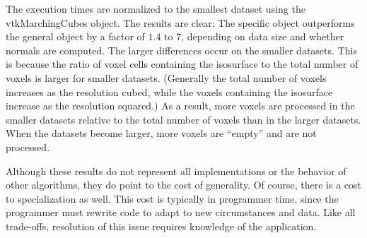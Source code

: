 The execution times are normalized to the smallest dataset using the vtkMarchingCubes object. The results are clear: The specific object outperforms the general object by a factor of $1.4$ to $7$, depending on data size and whether normals are computed. The larger differences occur on the smaller datasets. This is because the ratio of voxel cells containing the isosurface to the total number of voxels is larger for smaller datasets. (Generally the total number of voxels increases as the resolution cubed, while the voxels containing the isosurface increase as the resolution squared.) As a result, more voxels are processed in the smaller datasets relative to the total number of voxels than in the larger datasets. When the datasets become larger, more voxels are “empty” and are not processed.

Although these results do not represent all implementations or the behavior of other algorithms, they do point to the cost of generality. Of course, there is a cost to specialization as well. This cost is typically in programmer time, since the programmer must rewrite code to adapt to new circumstances and data. Like all trade-offs, resolution of this issue requires knowledge of the application.

